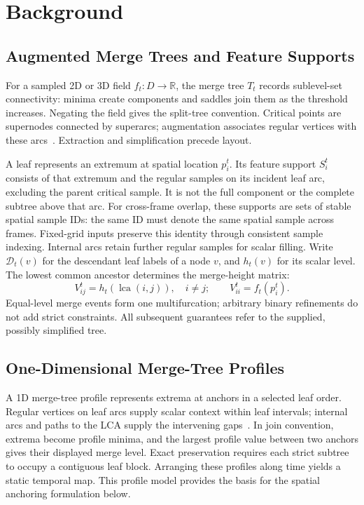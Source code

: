 \documentclass[review]{vgtc}
\newcommand{\lca}{\operatorname{lca}}
\begin{document}
\section{Background}\label{sec:background}
\subsection{Augmented Merge Trees and Feature Supports}
For a sampled 2D or 3D field $f_t:D\to\mathbb{R}$, the merge tree $T_t$ records sublevel-set connectivity: minima create components and saddles join them as the threshold increases. Negating the field gives the split-tree convention. Critical points are supernodes connected by superarcs; augmentation associates regular vertices with these arcs~\cite{Koepp:2023:TMTM,STMTM:2026,Tierny:2018:TTK}. Extraction and simplification precede layout.

A leaf represents an extremum at spatial location $p_i^t$. Its feature support $S_i^t$ consists of that extremum and the regular samples on its incident leaf arc, excluding the parent critical sample. It is not the full component or the complete subtree above that arc. For cross-frame overlap, these supports are sets of stable spatial sample IDs: the same ID must denote the same spatial sample across frames. Fixed-grid inputs preserve this identity through consistent sample indexing. Internal arcs retain further regular samples for scalar filling. Write $\mathcal{D}_t(v)$ for the descendant leaf labels of a node $v$, and $h_t(v)$ for its scalar level. The lowest common ancestor determines the merge-height matrix:
\begin{equation}\label{eq:merge}
 V_{ij}^t=h_t(\lca(i,j)),\quad i\ne j;\qquad
 V_{ii}^t=f_t(p_i^t).
\end{equation}
Equal-level merge events form one multifurcation; arbitrary binary refinements do not add strict constraints. All subsequent guarantees refer to the supplied, possibly simplified tree.

\subsection{One-Dimensional Merge-Tree Profiles}
A 1D merge-tree profile represents extrema at anchors in a selected leaf order. Regular vertices on leaf arcs supply scalar context within leaf intervals; internal arcs and paths to the LCA supply the intervening gaps~\cite{Koepp:2023:TMTM,STMTM:2026}. In join convention, extrema become profile minima, and the largest profile value between two anchors gives their displayed merge level. Exact preservation requires each strict subtree to occupy a contiguous leaf block. Arranging these profiles along time yields a static temporal map. This profile model provides the basis for the spatial anchoring formulation below.
\end{document}
